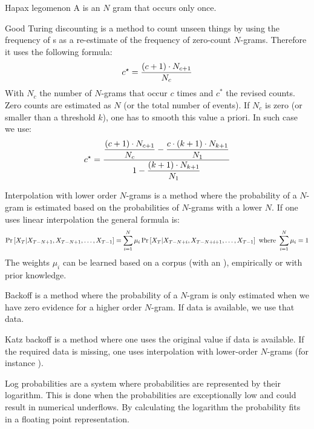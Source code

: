 \begin{df}[Singleton]{Hapax legomenon}
A \sb{} is an $N$ gram that occurs only once.
\end{df}
\begin{df}{Good Turing discounting}
\sb{} is a method to count unseen things by using the frequency of s as a re-estimate of the frequency of zero-count $N$-grams. Therefore it uses the following formula:
\begin{equation}
c^{\star}=\displaystyle\frac{\left(c+1\right)\cdot N_{c+1}}{N_c}
\end{equation}
With $N_c$ the number of $N$-grams that occur $c$ times and $c^*$ the revised counts. Zero counts are estimated as $N$ (or the total number of events). If $N_c$ is zero (or smaller than a threshold $k$), one has to smooth this value a priori. In such case we use:
\begin{equation}
c^{\star}=\displaystyle\frac{\displaystyle\frac{\left(c+1\right)\cdot N_{c+1}}{N_c}-\displaystyle\frac{c\cdot\left(k+1\right)\cdot N_{k+1}}{N_1}}{1-\displaystyle\frac{\left(k+1\right)\cdot N_{k+1}}{N_1}}
\end{equation}
\end{df}
\begin{df}{Interpolation with lower order $N$-grams}
\sb{} is a method where the probability of a $N$-gram is estimated based on the probabilities of $N$-grams with a lower $N$. If one uses linear interpolation the general formula is:
\begin{equation}
\Pr\left[X_T|X_{T-N+1},X_{T-N+1},\ldots,X_{T-1}\right]=\displaystyle\sum_{i=1}^{N}\mu_i\Pr\left[X_T|X_{T-N+i},X_{T-N+i+1},\ldots,X_{T-1}\right]\mbox{ where }\displaystyle\sum_{i=1}^{N}\mu_i=1
\end{equation}
The weights $\mu_i$ can be learned based on a corpus (with an ), empirically or with prior knowledge.
\end{df}
\begin{df}{Backoff}
\sb{} is a method where the probability of a $N$-gram is only estimated when we have zero evidence for a higher order $N$-gram. If data is available, we use that data.
\end{df}
\begin{df}{Katz backoff}
\sb{} is a  method where one uses the original value if data is available. If the required data is missing, one uses interpolation with lower-order $N$-grams (for instance ).
\end{df}
\begin{df}{Log probabilities}
\sb{} are a system where probabilities are represented by their logarithm. This is done when the probabilities are exceptionally low and could result in numerical underflows. By calculating the logarithm the probability fits in a floating point representation.
\end{df}
